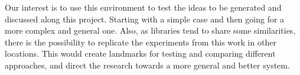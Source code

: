 Our interest is to use this environment to test the ideas to be generated and discussed along this project.
Starting with a simple case and then going for a more complex and general one.
Also, as libraries tend to share some similarities, there is the possibility to replicate the experiments from this work in other locations.
This would create landmarks for testing and comparing different approaches, and direct the research towards a more general and better system.

















